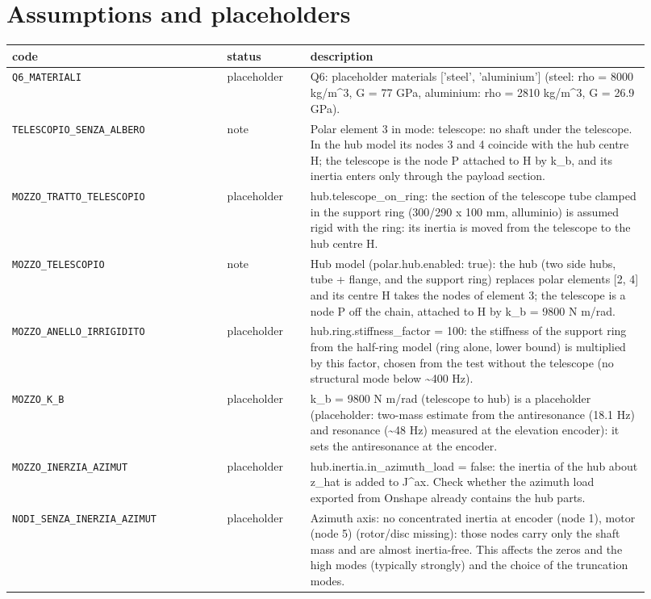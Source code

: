 \documentclass[10pt,a4paper]{article}
\numberwithin{equation}{section}
\begin{document}
\section{Assumptions and placeholders}\label{sec:assumptions}
\begin{longtable}{p{0.31\linewidth}p{0.12\linewidth}p{0.49\linewidth}}
\toprule code & status & description \\ \midrule\endhead
\texttt{Q6\_MATERIALI} & placeholder & Q6: placeholder materials ['steel', 'aluminium'] (steel: rho = 8000 kg/m\^{}3, G = 77 GPa, aluminium: rho = 2810 kg/m\^{}3, G = 26.9 GPa). \\
\texttt{TELESCOPIO\_SENZA\_ALBERO} & note & Polar element 3 in mode: telescope: no shaft under the telescope. In the hub model its nodes 3 and 4 coincide with the hub centre H; the telescope is the node P attached to H by k\_b, and its inertia enters only through the payload section. \\
\texttt{MOZZO\_TRATTO\_TELESCOPIO} & placeholder & hub.telescope\_on\_ring: the section of the telescope tube clamped in the support ring (300/290 x 100 mm, alluminio) is assumed rigid with the ring: its inertia is moved from the telescope to the hub centre H. \\
\texttt{MOZZO\_TELESCOPIO} & note & Hub model (polar.hub.enabled: true): the hub (two side hubs, tube + flange, and the support ring) replaces polar elements [2, 4] and its centre H takes the nodes of element 3; the telescope is a node P off the chain, attached to H by k\_b = 9800 N m/rad. \\
\texttt{MOZZO\_ANELLO\_IRRIGIDITO} & placeholder & hub.ring.stiffness\_factor = 100: the stiffness of the support ring from the half-ring model (ring alone, lower bound) is multiplied by this factor, chosen from the test without the telescope (no structural mode below \textasciitilde{}400 Hz). \\
\texttt{MOZZO\_K\_B} & placeholder & k\_b = 9800 N m/rad (telescope to hub) is a placeholder (placeholder: two-mass estimate from the antiresonance (18.1 Hz) and resonance (\textasciitilde{}48 Hz) measured at the elevation encoder): it sets the antiresonance at the encoder. \\
\texttt{MOZZO\_INERZIA\_AZIMUT} & placeholder & hub.inertia.in\_azimuth\_load = false: the inertia of the hub about z\_hat is added to J\^{}ax. Check whether the azimuth load exported from Onshape already contains the hub parts. \\
\texttt{NODI\_SENZA\_INERZIA\_AZIMUT} & placeholder & Azimuth axis: no concentrated inertia at encoder (node 1), motor (node 5) (rotor/disc missing): those nodes carry only the shaft mass and are almost inertia-free. This affects the zeros and the high modes (typically strongly) and the choice of the truncation modes. \\

\end{longtable}
\end{document}
